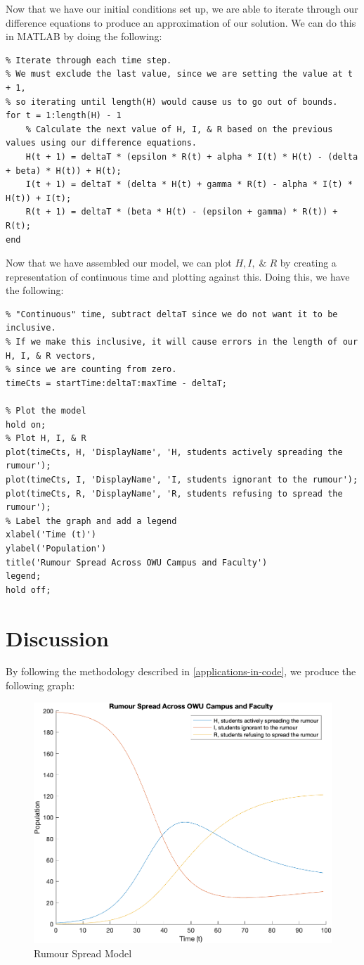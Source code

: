\documentclass[11pt]{article}
\begin{document}
Now that we have our initial conditions set up, we are able to iterate through our difference equations to produce an approximation of our solution.
We can do this in MATLAB by doing the following:
\begin{lstlisting}
% Iterate through each time step.  
% We must exclude the last value, since we are setting the value at t + 1, 
% so iterating until length(H) would cause us to go out of bounds.
for t = 1:length(H) - 1
    % Calculate the next value of H, I, & R based on the previous values using our difference equations.
    H(t + 1) = deltaT * (epsilon * R(t) + alpha * I(t) * H(t) - (delta + beta) * H(t)) + H(t);
    I(t + 1) = deltaT * (delta * H(t) + gamma * R(t) - alpha * I(t) * H(t)) + I(t);
    R(t + 1) = deltaT * (beta * H(t) - (epsilon + gamma) * R(t)) + R(t);
end
\end{lstlisting}
Now that we have assembled our model, we can plot $H, I, \; \& \; R$ by creating a representation of continuous time and plotting against this.
Doing this, we have the following:
\begin{lstlisting}
% "Continuous" time, subtract deltaT since we do not want it to be inclusive.
% If we make this inclusive, it will cause errors in the length of our H, I, & R vectors,
% since we are counting from zero.
timeCts = startTime:deltaT:maxTime - deltaT; 
    
% Plot the model
hold on;
% Plot H, I, & R
plot(timeCts, H, 'DisplayName', 'H, students actively spreading the rumour');
plot(timeCts, I, 'DisplayName', 'I, students ignorant to the rumour');
plot(timeCts, R, 'DisplayName', 'R, students refusing to spread the rumour');
% Label the graph and add a legend
xlabel('Time (t)')
ylabel('Population')
title('Rumour Spread Across OWU Campus and Faculty')
legend;
hold off;
\end{lstlisting}

\section{Discussion}
By following the methodology described in \ref{applications-in-code}, we produce the following graph:
\begin{figure}[H]
    \centering
    \includegraphics[width=0.8\columnwidth,keepaspectratio]{models/model.png}
    \caption{Rumour Spread Model}
    \label{model-graph}
\end{figure}
\end{document}
